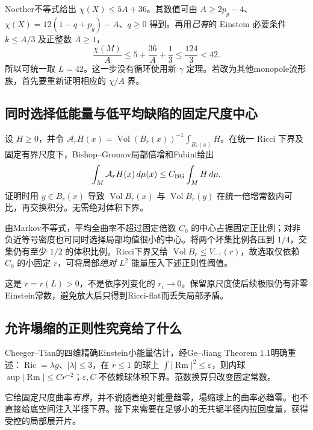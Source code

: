 \documentclass[UTF8,a4paper,11pt,fontset=fandol]{ctexart}
\numberwithin{equation}{section}
\theoremstyle{definition}
\newcommand{\Ric}{\operatorname{Ric}}
\newcommand{\Rm}{\operatorname{Rm}}
\newcommand{\Vol}{\operatorname{Vol}}
\begin{document}
Noether不等式给出 $\chi(X)\le5A+36$。其数值可由 $A\ge2p_g-4$、$\chi(X)=12(1-q+p_g)-A$、$q\ge0$ 得到。再用\emph{已有}的 Einstein 必要条件 $k\le A/3$ 及正整数 $A\ge1$，
\begin{equation}
 \frac{\chi(M)}A\le5+\frac{36}A+\frac13\le\frac{124}3<42.
\end{equation}
所以可统一取 $L=42$。这一步没有循环使用新 $\gamma$ 定理。若改为其他monopole流形族，首先要重新证明相应的 $\chi/A$ 界。

\subsection{同时选择低能量与低平均缺陷的固定尺度中心}
设 $H\ge0$，并令 $\mathcal A_rH(x)=\Vol(B_r(x))^{-1}\int_{B_r(x)}H$。在统一 Ricci 下界及固定有界尺度下，Bishop--Gromov局部倍增和Fubini给出
\begin{equation}\label{eq:fubini}
 \int_M\mathcal A_rH(x)\,d\mu(x)\le C_{\rm BG}\int_MH\,d\mu.
\end{equation}
证明时用 $y\in B_r(x)$ 导致 $\Vol B_r(x)$ 与 $\Vol B_r(y)$ 在统一倍增常数内可比，再交换积分。无需绝对体积下界。

由Markov不等式，平均全曲率不超过固定倍数 $C_0$ 的中心占据固定正比例；对非负近等号密度也可同时选择局部均值很小的中心。将两个坏集比例各压到 $1/4$，交集仍有至少 $1/2$ 的体积比例。Ricci下界又给 $\Vol B_r\le V_{-1}(r)$，故选取仅依赖 $C_0$ 的小固定 $r$，可将局部\emph{绝对} $L^2$ 能量压入下述正则性阈值。

这是 $r=r(L)>0$，不是依序列变化的 $r_i\to0$。保留原尺度使后续极限仍有非零Einstein常数，避免放大后只得到Ricci-flat而丢失局部矛盾。

\subsection{允许塌缩的正则性究竟给了什么}
Cheeger--Tian的四维精确Einstein小能量估计，经Ge--Jiang Theorem 1.1明确重述：$\Ric=\lambda g$、$|\lambda|\le3$，在 $r\le1$ 的球上 $\int|\Rm|^2\le\varepsilon$，则内球 $\sup|\Rm|\le Cr^{-2}$；$\varepsilon,C$ 不依赖球体积下界\cite{CT2006,GJ2017}。范数换算只改变固定常数。

它给固定尺度曲率\emph{有界}，并不说随着绝对能量趋零，塌缩球上的曲率必趋零。也不直接给底空间注入半径下界。接下来需要在足够小的无共轭半径内拉回度量，获得受控的局部展开片。
\end{document}
